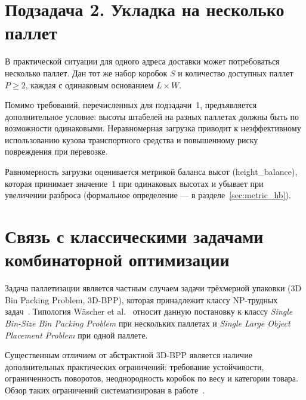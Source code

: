 \section{Подзадача 2. Укладка на несколько паллет}

В практической ситуации для одного адреса доставки может потребоваться несколько паллет. Дан тот же набор коробок $S$ и количество доступных паллет $P \geq 2$, каждая с одинаковым основанием $L \times W$.

Помимо требований, перечисленных для подзадачи~1, предъявляется дополнительное условие: высоты штабелей на разных паллетах должны быть по возможности одинаковыми. Неравномерная загрузка приводит к неэффективному использованию кузова транспортного средства и повышенному риску повреждения при перевозке.

Равномерность загрузки оценивается метрикой баланса высот (height\_balance), которая принимает значение~1 при одинаковых высотах и убывает при увеличении разброса (формальное определение --- в разделе~\ref{sec:metric_hb}).

\section{Связь с классическими задачами комбинаторной оптимизации}

Задача паллетизации является частным случаем задачи трёхмерной упаковки (3D Bin Packing Problem, 3D-BPP), которая принадлежит классу NP-трудных задач~\cite{Martello2000}. Типология Wäscher et al.~\cite{Wascher2007} относит данную постановку к классу \emph{Single Bin-Size Bin Packing Problem} при нескольких паллетах и \emph{Single Large Object Placement Problem} при одной паллете.

Существенным отличием от абстрактной 3D-BPP является наличие дополнительных практических ограничений: требование устойчивости, ограниченность поворотов, неоднородность коробок по весу и категории товара. Обзор таких ограничений систематизирован в работе~\cite{Bortfeldt2013}.
